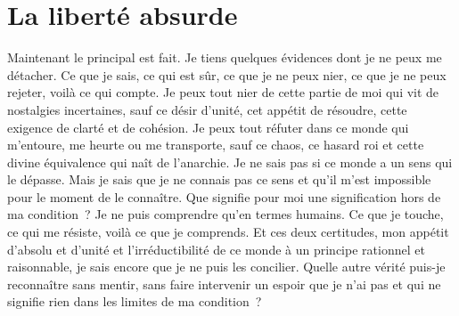 \documentclass{book}
\begin{document}
\section{La liberté absurde}

Maintenant le principal est fait. Je tiens quelques évidences dont je ne peux me détacher. Ce que je sais, ce qui est sûr, ce que je ne peux nier, ce que je ne peux rejeter, voilà ce qui compte. Je peux tout nier de cette partie de moi qui vit de nostalgies incertaines, sauf ce désir d'unité, cet appétit de résoudre, cette exigence de clarté et de cohésion. Je peux tout réfuter dans ce monde qui m'entoure, me heurte ou me transporte, sauf ce chaos, ce hasard roi et cette divine équivalence qui naît de l'anarchie. Je ne sais pas si ce monde a un sens qui le dépasse. Mais je sais que je ne connais pas ce sens et qu'il m'est impossible pour le moment de le connaître. Que signifie pour moi une signification hors de ma condition ? Je ne puis comprendre qu'en termes humains. Ce que je touche, ce qui me résiste, voilà ce que je comprends. Et ces deux certitudes, mon appétit d'absolu et d'unité et l'irréductibilité de ce monde à un principe rationnel et raisonnable, je sais encore que je ne puis les concilier. Quelle autre vérité puis-je reconnaître sans mentir, sans faire intervenir un espoir que je n'ai pas et qui ne signifie rien dans les limites de ma condition ?
\end{document}
